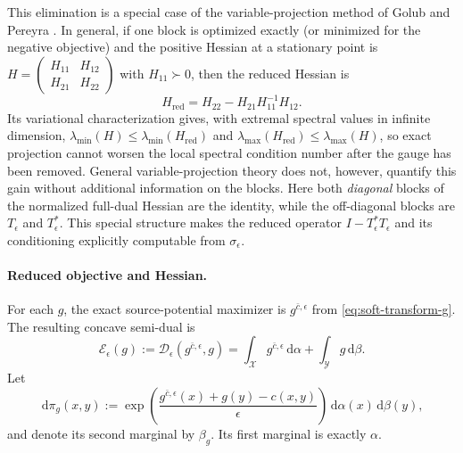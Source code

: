 \documentclass[11pt]{article}
\theoremstyle{definition}
\theoremstyle{remark}
\newcommand{\eps}{\epsilon}
\newcommand{\al}{\alpha}
\newcommand{\be}{\beta}
\newcommand{\Xx}{\mathcal{X}}
\newcommand{\Yy}{\mathcal{Y}}
\newcommand{\Dd}{\mathcal{D}}
\newcommand{\Ee}{\mathcal{E}}
\newcommand{\dd}{\,\mathrm{d}}
\begin{document}
This elimination is a special case of the variable-projection method
of Golub and Pereyra
\cite{GolubPereyra1973,GolubPereyra2003}. In general, if one block is
optimized exactly (or minimized for the negative objective) and the
positive Hessian at a stationary point is
$H=\left(\begin{smallmatrix}H_{11}&H_{12}\\
H_{21}&H_{22}\end{smallmatrix}\right)$ with $H_{11}\succ0$, then the
reduced Hessian is
\begin{equation}
  \label{eq:general-varpro-schur}
  H_{\mathrm{red}}
  =
  H_{22}-H_{21}H_{11}^{-1}H_{12}.
\end{equation}
Its variational characterization gives, with extremal spectral values
in infinite dimension,
$\lambda_{\min}(H)\leq\lambda_{\min}(H_{\mathrm{red}})$ and
$\lambda_{\max}(H_{\mathrm{red}})\leq\lambda_{\max}(H)$, so exact
projection cannot worsen the local spectral condition number after the
gauge has been removed. General variable-projection theory does not,
however, quantify this gain without additional information on the
blocks. Here both \emph{diagonal} blocks of the normalized full-dual
Hessian are the identity, while the off-diagonal blocks are
$T_\eps$ and $T_\eps^\ast$. This special structure makes the reduced
operator $I-T_\eps^\ast T_\eps$ and its conditioning explicitly
computable from $\sigma_\eps$.

\paragraph{Reduced objective and Hessian.}
For each $g$, the exact source-potential maximizer is
$g^{\bar c,\eps}$ from \eqref{eq:soft-transform-g}. The resulting
concave semi-dual is
\begin{equation}
  \label{eq:semidual-definition}
  \Ee_\eps(g)
  :=
  \Dd_\eps(g^{\bar c,\eps},g)
  =
  \int_{\Xx}g^{\bar c,\eps}\dd\al
  +
  \int_{\Yy}g\dd\be.
\end{equation}
Let
\begin{equation}
  \label{eq:semidual-coupling}
  \dd\pi_g(x,y)
  :=
  \exp\left(
    \frac{g^{\bar c,\eps}(x)+g(y)-c(x,y)}{\eps}
  \right)
  \dd\al(x)\dd\be(y),
\end{equation}
and denote its second marginal by $\be_g$. Its first marginal is
exactly $\al$.
\end{document}
